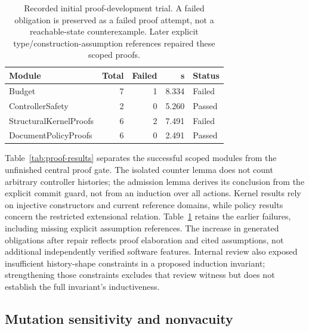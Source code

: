 \documentclass[pdflatex,sn-mathphys-num]{sn-jnl}
\theoremstyle{thmstyleone}
\theoremstyle{thmstylethree}
\theoremstyle{thmstyletwo}
\begin{document}
\begin{table}[tbp]
\centering
\caption{Recorded initial proof-development trial. A failed obligation is preserved as a failed proof attempt, not a reachable-state counterexample. Later explicit type/construction-assumption references repaired these scoped proofs.}\label{tab:proof-development}
\footnotesize
\setlength{\tabcolsep}{3pt}
\renewcommand{\arraystretch}{1.13}
\begin{tabularx}{\linewidth}{@{}Xrrrl@{}}\toprule
Module & Total & Failed & s & Status\\\midrule
Budget & 7 & 1 & 8.334 & Failed\\
ControllerSafety & 2 & 0 & 5.260 & Passed\\
StructuralKernelProofs & 6 & 2 & 7.491 & Failed\\
DocumentPolicyProofs & 6 & 0 & 2.491 & Passed\\
\bottomrule\end{tabularx}
\end{table}

Table~\ref{tab:proof-results} separates the successful scoped modules from the unfinished central proof gate. The isolated counter lemma does not count arbitrary controller histories; the admission lemma derives its conclusion from the explicit commit guard, not from an induction over all actions. Kernel results rely on injective constructors and current reference domains, while policy results concern the restricted extensional relation. Table~\ref{tab:proof-development} retains the earlier failures, including missing explicit assumption references. The increase in generated obligations after repair reflects proof elaboration and cited assumptions, not additional independently verified software features. Internal review also exposed insufficient history-shape constraints in a proposed induction invariant; strengthening those constraints excludes that review witness but does not establish the full invariant's inductiveness.

\subsection{Mutation sensitivity and nonvacuity}
\end{document}
